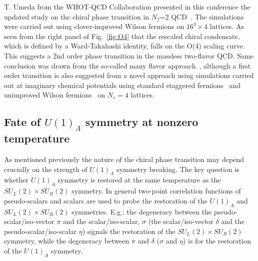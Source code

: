 \documentclass{PoS}
\begin{document}
T. Umeda from the WHOT-QCD Collaboration presented in this conference the updated study on the chiral phase transition in $N_f$=2 QCD~\cite{Umeda:2016qdo}. The simulations were carried out
using clover-improved Wilson fermions on $16^3\times4$ lattices. As seen from the right panel of Fig.~\ref{fig:O4} that the rescaled chiral condensate, which is defined by a Ward-Takahashi identity, falls on the O(4) scaling curve.
This suggests a 2nd order phase transition in the massless two-flavor QCD. Same conclusion was drawn from the so-called many flavor approach~\cite{Yamada:2016hvz,Ejiri:2012rr}, although a first order transition is also suggested from a novel approach using simulations carried out at imaginary chemical potentials using standard staggered fermions~\cite{Bonati:2014kpa} and unimproved Wilson fermions~\cite{Philipsen:2016hkv} on $N_\tau=4$ lattices.









\subsection{Fate of $U(1)_A$ symmetry at nonzero temperature}
\label{sec:axialU1}



As mentioned previously the nature of the chiral phase transition may depend crucially on the strength of $U(1)_A$ symmetry breaking.
The key question is whether $U(1)_A$ symmetry is restored at the same temperature as the $SU_L(2)\times SU_R(2)$ symmetry.
In general two-point correlation functions of pseudo-scalars and scalars are used to probe the restoration of the $U(1)_A$ and $SU_L(2)\times SU_R(2)$ symmetries.
E.g.: the degeneracy between the pseudo-scalar/iso-vector $\pi$ and the scalar/iso-scalar, $\sigma$ (the scalar/iso-vector $\delta$ and the pseudo-scalar/iso-scalar $\eta$) signals
the restoration of the $SU_L(2)\times SU_R(2)$  symmetry, while the degeneracy between $\pi$ and $\delta$ ($\sigma$ and $\eta$) is for the restoration of the $U(1)_A$ symmetry.
\end{document}
